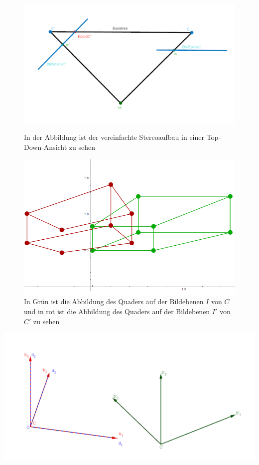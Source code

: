 \begin{figure}[!htb]
	\includegraphics[width=\linewidth]{images/AufbauMinimalbeispiel.png}
	\caption{In der Abbildung ist der vereinfachte Stereoaufbau in einer Top-Down-Ansicht zu sehen}
	\label{fig:aufbauMinimalTopDown}
	\endminipage\hfill
	\includegraphics[width=\linewidth]{images/QuadrateMinimalBeispiel.png}
	\caption{In Grün ist die Abbildung des Quaders auf der Bildebenen $I$ von $C$ und in rot ist die Abbildung des Quaders auf der Bildebenen $I'$ von $C'$ zu sehen}
	\label{fig:AbbildungenMinimal}
	\endminipage\hfill
\end{figure}

\begin{minipage}{\linewidth}
	\centering
	\includegraphics[width=.52\linewidth]{images/KS_Minimalbeispiel.png}
	\label{fig:KoordsystemeMinimal}
\end{minipage}\\ \\

